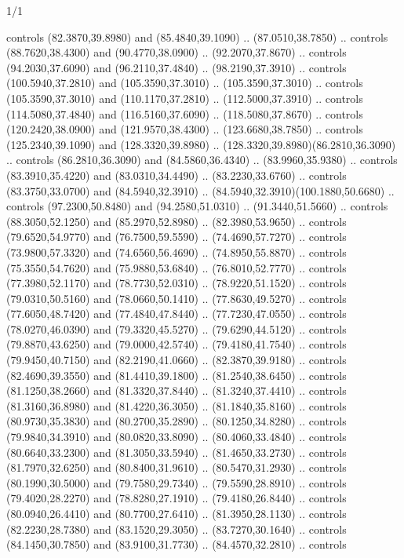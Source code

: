 \begin{flagdescription}{1/1}
\begin{scope}[xshift=0.75\flaglength]
\begin{scope}[scale=0.00209\flagwidth,yshift=134.4mm,xshift=-29.7mm]
\begin{scope}[y=0.80pt, x=0.80pt, yscale=-1, xscale=1, inner sep=0pt, outer sep=0pt,line width=0.0015\flagwidth]
  controls (82.3870,39.8980) and (85.4840,39.1090) .. (87.0510,38.7850) ..
  controls (88.7620,38.4300) and (90.4770,38.0900) .. (92.2070,37.8670) ..
  controls (94.2030,37.6090) and (96.2110,37.4840) .. (98.2190,37.3910) ..
  controls (100.5940,37.2810) and (105.3590,37.3010) .. (105.3590,37.3010) ..
  controls (105.3590,37.3010) and (110.1170,37.2810) .. (112.5000,37.3910) ..
  controls (114.5080,37.4840) and (116.5160,37.6090) .. (118.5080,37.8670) ..
  controls (120.2420,38.0900) and (121.9570,38.4300) .. (123.6680,38.7850) ..
  controls (125.2340,39.1090) and (128.3320,39.8980) ..
  (128.3320,39.8980)(86.2810,36.3090) .. controls (86.2810,36.3090) and
  (84.5860,36.4340) .. (83.9960,35.9380) .. controls (83.3910,35.4220) and
  (83.0310,34.4490) .. (83.2230,33.6760) .. controls (83.3750,33.0700) and
  (84.5940,32.3910) .. (84.5940,32.3910)(100.1880,50.6680) .. controls
  (97.2300,50.8480) and (94.2580,51.0310) .. (91.3440,51.5660) .. controls
  (88.3050,52.1250) and (85.2970,52.8980) .. (82.3980,53.9650) .. controls
  (79.6520,54.9770) and (76.7500,59.5590) .. (74.4690,57.7270) .. controls
  (73.9800,57.3320) and (74.6560,56.4690) .. (74.8950,55.8870) .. controls
  (75.3550,54.7620) and (75.9880,53.6840) .. (76.8010,52.7770) .. controls
  (77.3980,52.1170) and (78.7730,52.0310) .. (78.9220,51.1520) .. controls
  (79.0310,50.5160) and (78.0660,50.1410) .. (77.8630,49.5270) .. controls
  (77.6050,48.7420) and (77.4840,47.8440) .. (77.7230,47.0550) .. controls
  (78.0270,46.0390) and (79.3320,45.5270) .. (79.6290,44.5120) .. controls
  (79.8870,43.6250) and (79.0000,42.5740) .. (79.4180,41.7540) .. controls
  (79.9450,40.7150) and (82.2190,41.0660) .. (82.3870,39.9180) .. controls
  (82.4690,39.3550) and (81.4410,39.1800) .. (81.2540,38.6450) .. controls
  (81.1250,38.2660) and (81.3320,37.8440) .. (81.3240,37.4410) .. controls
  (81.3160,36.8980) and (81.4220,36.3050) .. (81.1840,35.8160) .. controls
  (80.9730,35.3830) and (80.2700,35.2890) .. (80.1250,34.8280) .. controls
  (79.9840,34.3910) and (80.0820,33.8090) .. (80.4060,33.4840) .. controls
  (80.6640,33.2300) and (81.3050,33.5940) .. (81.4650,33.2730) .. controls
  (81.7970,32.6250) and (80.8400,31.9610) .. (80.5470,31.2930) .. controls
  (80.1990,30.5000) and (79.7580,29.7340) .. (79.5590,28.8910) .. controls
  (79.4020,28.2270) and (78.8280,27.1910) .. (79.4180,26.8440) .. controls
  (80.0940,26.4410) and (80.7700,27.6410) .. (81.3950,28.1130) .. controls
  (82.2230,28.7380) and (83.1520,29.3050) .. (83.7270,30.1640) .. controls
  (84.1450,30.7850) and (83.9100,31.7730) .. (84.4570,32.2810) .. controls

\end{scope}
\end{scope}
\end{scope}
\end{flagdescription}
